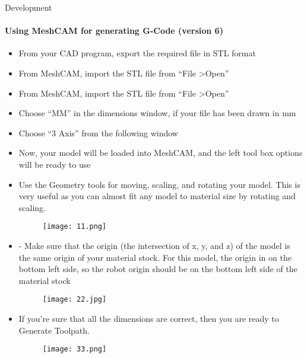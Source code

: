 \documentclass[a4paper]{book}
\begin{document}
\begin{chapter}{Development}
\paragraph{Using MeshCAM for generating G-Code (version 6)}
\begin{itemize}
	\item From your CAD program, export the required file in STL format
	\item From MeshCAM, import the STL file from “File \textgreater Open”
	\item From MeshCAM, import the STL file from “File \textgreater Open”
	\item Choose “MM” in the dimensions window, if your file has been drawn in mm
	\item Choose “3 Axis” from the following window 
	\item Now, your model will be loaded into MeshCAM, and the left tool box options will be ready to use
	\item Use the Geometry tools for moving, scaling, and rotating your model. This is very useful as you can almost fit any model to material size by rotating and scaling.
	\begin{figure}[H]
		\centering
		\texttt{[image: 11.png]}
	\end{figure} 
\item -	Make sure that the origin (the intersection of x, y, and z) of the model is the same origin of your material stock. 
For this model, the origin in on the bottom left side, so the robot origin should be on the bottom left side of the material stock
\begin{figure}[H]
	\centering
	\texttt{[image: 22.jpg]}
\end{figure} 
\item If you’re sure that all the dimensions are correct, then you are ready to Generate Toolpath. 
\begin{figure}[ht]
	\centering
	\texttt{[image: 33.png]}
\end{figure}


\end{itemize}
\end{chapter}
\end{document}

